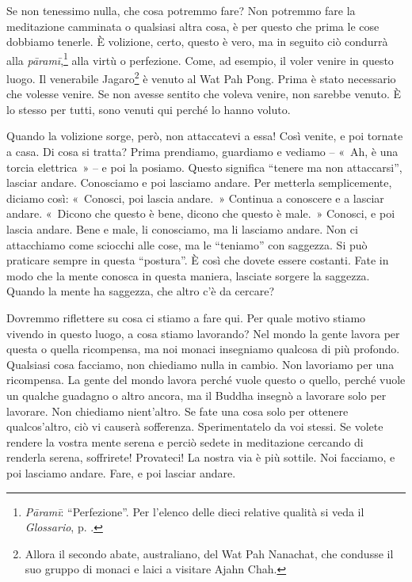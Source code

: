 Se non tenessimo nulla, che cosa potremmo fare? Non potremmo fare la
meditazione camminata o qualsiasi altra cosa, è per questo che prima le
cose dobbiamo tenerle. È volizione, certo, questo è vero, ma in seguito
ciò condurrà alla \emph{pāramī},\footnote{\emph{Pāramī}: ``Perfezione''.
  Per l'elenco delle dieci relative qualità si veda il \emph{Glossario}, p. \pageref{glossary-parami}.}
alla virtù o perfezione. Come, ad esempio, il voler venire in questo
luogo. Il venerabile Jagaro\footnote{Allora il secondo abate,
  australiano, del Wat Pah Nanachat, che condusse il suo gruppo di
  monaci e laici a visitare Ajahn Chah.} è venuto al Wat Pah Pong. Prima
è stato necessario che volesse venire. Se non avesse sentito che voleva
venire, non sarebbe venuto. È lo stesso per tutti, sono venuti qui
perché lo hanno voluto.

Quando la volizione sorge, però, non attaccatevi a essa! Così venite, e
poi tornate a casa. Di cosa si tratta? Prima prendiamo, guardiamo e
vediamo -- «~Ah, è una torcia elettrica~» -- e poi la posiamo. Questo
significa ``tenere ma non attaccarsi'', lasciar andare. Conosciamo e poi
lasciamo andare. Per metterla semplicemente, diciamo così: «~Conosci,
poi lascia andare.~» Continua a conoscere e a lasciar andare. «~Dicono
che questo è bene, dicono che questo è male.~» Conosci, e poi lascia
andare. Bene e male, li conosciamo, ma li lasciamo andare. Non ci
attacchiamo come sciocchi alle cose, ma le ``teniamo'' con saggezza. Si
può praticare sempre in questa ``postura''. È così che dovete essere
costanti. Fate in modo che la mente conosca in questa maniera, lasciate
sorgere la saggezza. Quando la mente ha saggezza, che altro c'è da
cercare?

Dovremmo riflettere su cosa ci stiamo a fare qui. Per quale motivo
stiamo vivendo in questo luogo, a cosa stiamo lavorando? Nel mondo la
gente lavora per questa o quella ricompensa, ma noi monaci insegniamo
qualcosa di più profondo. Qualsiasi cosa facciamo, non chiediamo nulla
in cambio. Non lavoriamo per una ricompensa. La gente del mondo lavora
perché vuole questo o quello, perché vuole un qualche guadagno o altro
ancora, ma il Buddha insegnò a lavorare solo per lavorare. Non chiediamo
nient'altro. Se fate una cosa solo per ottenere qualcos'altro, ciò vi
causerà sofferenza. Sperimentatelo da voi stessi. Se volete rendere la
vostra mente serena e perciò sedete in meditazione cercando di renderla
serena, soffrirete! Provateci! La nostra via è più sottile. Noi
facciamo, e poi lasciamo andare. Fare, e poi lasciar andare.

